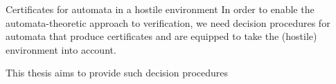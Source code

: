 \documentclass[../talk.tex]{subfiles}
\begin{document}
\begin{frame}{Certificates for automata in a hostile environment}
    In order to enable the \alert{automata-theoretic approach to verification},
    we need decision procedures for automata that \alert{produce certificates}
    and are equipped to \alert{take the (hostile) environment into account}.

    \vspace*{1em}

    {%
        This thesis aims to provide such decision procedures
    }

\end{frame}
\end{document}

